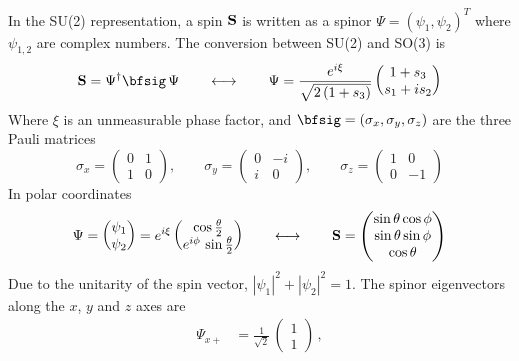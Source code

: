 {In the SU(2) representation, a spin ${\bf S}$ is written as a spinor $\Psi = \left( \psi_{1}, \psi_{2}
\right)^{T}$ where $\psi_{1,2}$ are complex numbers. The conversion between SU(2) and SO(3) is
\begin{equation}  
  \Bf S = \Psi^{\dagger} \Bf {\bfsig} \, \Psi 
  \qquad \longleftrightarrow \qquad
  \Psi  = \frac{e^{i \xi}}{\sqrt{2 \left(1+s_{3}\right)}}   
     \begin{pmatrix} 1+s_{3} \\ s_{1}+i s_{2} \end{pmatrix}   
\end{equation}  
Where $\xi$ is an unmeasurable phase factor, and ${\bfsig} = (\sigma_x, \sigma_y, \sigma_z)$ are
the three Pauli matrices
\begin{equation}
  \sigma_x = \begin{pmatrix} 0 &  1 \\ 1 &  0 \end{pmatrix}, \qquad
  \sigma_y = \begin{pmatrix} 0 & -i \\ i &  0 \end{pmatrix}, \qquad
  \sigma_z = \begin{pmatrix} 1 &  0 \\ 0 & -1 \end{pmatrix}
\end{equation}
In polar coordinates
\begin{equation}   
  \Psi = \begin{pmatrix} \psi_{1} \\ \psi_{2} \end{pmatrix}
       = e^{i \xi}
         \begin{pmatrix} 
            \cos \frac{\theta}{2} \\   
            e^{i \phi} \, \sin \frac{\theta}{2}
         \end{pmatrix}
  \qquad \longleftrightarrow \qquad
  {\bf S} = \begin{pmatrix} \sin \theta \cos \phi \\   
                          \sin \theta \sin \phi \\   
                          \cos \theta \end{pmatrix}
  \label{pp1p2}
\end{equation}
Due to the unitarity of the spin vector,   
$|\psi_{1}|^{2} + |\psi_{2}|^{2} = 1$.
The spinor eigenvectors along the $x$, $y$ and $z$ axes are
\begin{align}
   \Psi_{x+} &= \frac{1}{\sqrt{2}} \, \begin{pmatrix} 1 \\ 1 \end{pmatrix} \, , 

\end{align}}
